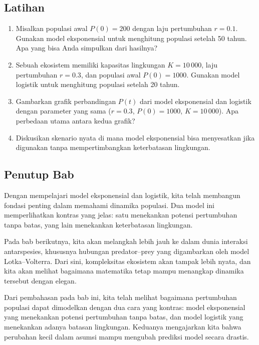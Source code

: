 \documentclass{bukumjh}
\begin{document}
\subsection{Latihan}
\begin{enumerate}
    \item Misalkan populasi awal $P(0) = 200$ dengan laju pertumbuhan $r = 0.1$. Gunakan model eksponensial untuk menghitung populasi setelah 50 tahun. Apa yang bisa Anda simpulkan dari hasilnya?
    \item Sebuah ekosistem memiliki kapasitas lingkungan $K = 10\,000$, laju pertumbuhan $r = 0.3$, dan populasi awal $P(0) = 1000$. Gunakan model logistik untuk menghitung populasi setelah 20 tahun.
    \item Gambarkan grafik perbandingan $P(t)$ dari model eksponensial dan logistik dengan parameter yang sama ($r=0.3$, $P(0)=1000$, $K=10\,000$). Apa perbedaan utama antara kedua grafik?
    \item Diskusikan skenario nyata di mana model eksponensial bisa menyesatkan jika digunakan tanpa mempertimbangkan keterbatasan lingkungan.
\end{enumerate}

\subsection{Penutup Bab}

Dengan mempelajari model eksponensial dan logistik, kita telah membangun fondasi penting dalam memahami dinamika populasi. Dua model ini memperlihatkan kontras yang jelas: satu menekankan potensi pertumbuhan tanpa batas, yang lain menekankan keterbatasan lingkungan.  

Pada bab berikutnya, kita akan melangkah lebih jauh ke dalam dunia interaksi antarspesies, khususnya hubungan predator–prey yang digambarkan oleh model Lotka–Volterra. Dari sini, kompleksitas ekosistem akan tampak lebih nyata, dan kita akan melihat bagaimana matematika tetap mampu menangkap dinamika tersebut dengan elegan.


Dari pembahasan pada bab ini, kita telah melihat bagaimana pertumbuhan populasi dapat dimodelkan dengan dua cara yang kontras: model eksponensial yang menekankan potensi pertumbuhan tanpa batas, dan model logistik yang menekankan adanya batasan lingkungan. Keduanya mengajarkan kita bahwa perubahan kecil dalam asumsi mampu mengubah prediksi model secara drastis.
\end{document}
